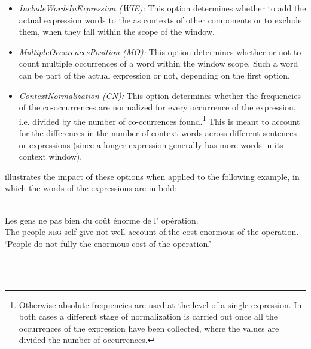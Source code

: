 \documentclass[output=paper,modfonts,nonflat]{langsci/langscibook}
\begin{document}
\begin{itemize}

\item {\em IncludeWordsInExpression (WIE):} This option determines
  whether to add the actual expression words to the  as
  contexts of other components or to exclude them, when they fall
  within the scope of the window.


\item {\em MultipleOccurencesPosition (MO):} This option determines whether
  or not to count multiple occurrences of a word within the window
  scope. Such a word can be part of the actual expression or not,
  depending on the first option.


\item {\em ContextNormalization (CN):} This option determines whether the
  frequencies of the co-occurrences are normalized for every
  occurrence of the expression, i.e. divided by the number of
  co-ccurrences found.\footnote{Otherwise absolute frequencies are
    used at the level of a single expression. In both cases a
    different stage of normalization is carried out once all the
    occurrences of the expression have been collected, where the
    values are divided the number of occurrences.} This is meant to
  account for the differences in the number of context words across
  different sentences or expressions (since a longer expression
  generally has more words in its context window).
\end{itemize}


 illustrates the impact of these options when applied to the following example, in which the words of the expressions are in bold:

\vspace*{.2cm}

\begin{minipage}{\linewidth}
\ea 
{}\\
\gll Les gens ne   pas bien  du coût énorme de l' opération.\\
     The people \textsc{neg}  self give          not well account of.the cost enormous of the operation.\\

\glt `People do not fully  the enormous cost of the operation.'\\
\z
\end{minipage}\\
\\
\end{document}
